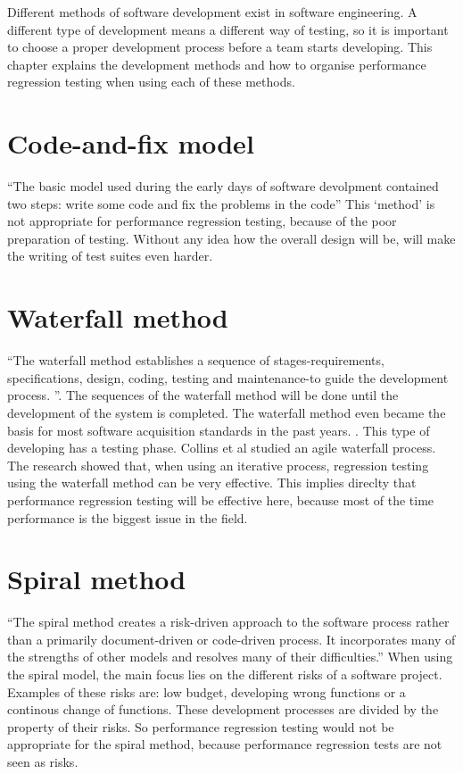 Different methods of software development exist in software engineering. A different type of development means a different way of testing, so it is important to choose a proper development process before a team starts developing. This chapter explains the development methods and how to organise performance regression testing when using each of these methods.

\section{Code-and-fix model}
``The basic model used during the early days of software devolpment contained two steps: write some code and fix the problems in the code'' \cite{boehm1988spiral} This `method' is not appropriate for performance regression testing, because of the poor preparation of testing. Without any idea how the overall design will be, will make the writing of test suites even harder.

\section{Waterfall method}
``The waterfall method establishes a sequence of stages-requirements, specifications, design, coding, testing and maintenance-to guide the development process. ''\cite{kang1989software}. The sequences of the waterfall method will be done until the development of the system is completed. The waterfall method even became the basis for most software acquisition standards in the past years. \cite{boehm1988spiral}. This type of developing has a testing phase. Collins et al studied an agile waterfall process. \cite{collins2010iterative} The research showed that, when using an iterative process, regression testing using the waterfall method can be very effective. This implies direclty that performance regression testing will be effective here, because most of the time performance is the biggest issue in the field. \cite{foo2010mining}

\section{Spiral method}
``The spiral method creates a risk-driven approach to the software process rather than a primarily document-driven or code-driven process. It incorporates many of the strengths
of other models and resolves many of their
difficulties.''\cite{boehm1988spiral} When using the spiral model, the main focus lies on the different risks of a software project. Examples of these risks are: low budget, developing wrong functions or a continous change of functions. These development processes are divided by the property of their risks. So performance regression testing would not be appropriate for the spiral method, because performance regression tests are not seen as risks.

